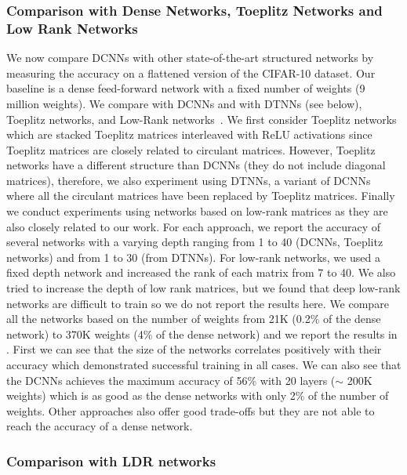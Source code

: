 \subsubsection{Comparison with Dense Networks, Toeplitz Networks and Low Rank Networks}

We now compare DCNNs with other state-of-the-art structured networks by measuring the accuracy on a flattened version of the CIFAR-10 dataset.
Our baseline is a dense feed-forward network with a fixed number of weights (9 million weights).
We compare with DCNNs and with DTNNs (see below), Toeplitz networks, and Low-Rank networks~\cite{yu2017compressing}.
We first consider Toeplitz networks which are stacked Toeplitz matrices interleaved with ReLU activations since Toeplitz matrices are closely related to circulant matrices.
However, Toeplitz networks have a different structure than DCNNs (they do not include diagonal matrices), therefore, we also experiment using DTNNs, a variant of DCNNs where all the circulant matrices have been replaced by Toeplitz matrices.
Finally we conduct experiments using networks based on low-rank matrices as they are also closely related to our work.
For each approach, we report the accuracy of several networks with a varying depth ranging from 1 to 40 (DCNNs, Toeplitz networks) and from 1 to 30 (from DTNNs).
For low-rank networks, we used a fixed depth network and increased the rank of each matrix from 7 to 40.
We also tried to increase the depth of low rank matrices, but we found that deep low-rank networks are difficult to train so we do not report the results here.
We compare all the networks based on the number of weights from 21K (0.2\% of the dense network) to 370K weights (4\% of the dense network) and we report the results in . 
First we can see that the size of the networks correlates positively with their accuracy which demonstrated successful training in all cases.
We can also see that the DCNNs achieves the maximum accuracy of 56\% with 20 layers ($\sim$ 200K weights) which is as good as the dense networks with only 2\% of the number of weights.
Other approaches also offer good trade-offs but they are not able to reach the accuracy of a dense network.


\subsubsection{Comparison with LDR networks}

